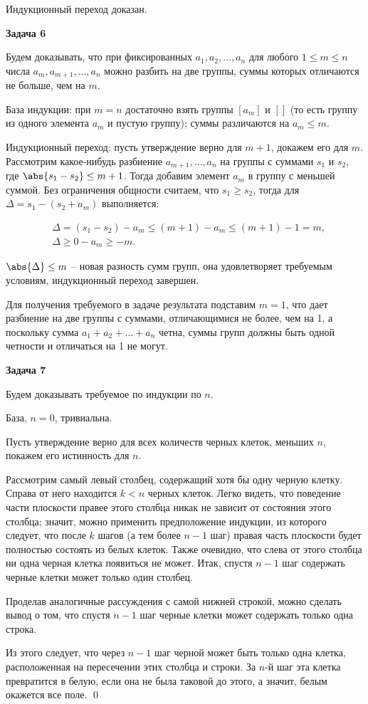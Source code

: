     Индукционный переход доказан.


\begin{center}
\textbf{Задача 6}
\end{center}    Будем доказывать, что при фиксированных $a_1, a_2, \dots, a_n$ для любого $1 \le m \le n$ числа $a_m, a_{m+1}, \dots, a_n$ можно разбить на две группы, суммы которых отличаются не больше, чем на $m$.

    База индукции: при $m = n$ достаточно взять группы $[a_m]$ и $[]$ (то есть группу из одного элемента $a_m$ и пустую группу); суммы различаются на $a_m \le m$.

    Индукционный переход: пусть утверждение верно для $m + 1$, докажем его для $m$. Рассмотрим какое-нибудь разбиение $a_{m+1}, \dots, a_n$ на группы с суммами $s_1$ и $s_2$, где $\abs{s_1 - s_2} \le m + 1$. Тогда добавим элемент $a_m$ в группу с меньшей суммой. Без ограничения общности считаем, что $s_1 \ge s_2$, тогда для $\Delta = s_1 - (s_2 + a_m)$ выполняется:

    \begin{align*}
        & \Delta = (s_1 - s_2) - a_m \le (m + 1) - a_m \le (m + 1) - 1 = m, \\
        & \Delta \ge 0 - a_m \ge -m.
    \end{align*}

    $\abs{\Delta} \le m$ -- новая разность сумм групп, она удовлетворяет требуемым условиям, индукционный переход завершен.

    Для получения требуемого в задаче результата подставим $m = 1$, что дает разбиение на две группы с суммами, отличающимися не более, чем на 1, а поскольку сумма $a_1 + a_2 + \dots + a_n$ четна, суммы групп должны быть одной четности и отличаться на 1 не могут.


\begin{center}
\textbf{Задача 7}
\end{center}    Будем доказывать требуемое по индукции по $n$.

    База, $n = 0$, тривиальна.

    Пусть утверждение верно для всех количеств черных клеток, меньших $n$, покажем его истинность для $n$.

    Рассмотрим самый левый столбец, содержащий хотя бы одну черную клетку. Справа от него находится $k < n$ черных клеток. Легко видеть, что поведение части плоскости правее этого столбца никак не зависит от состояния этого столбца; значит, можно применить предположение индукции, из которого следует, что после $k$ шагов (а тем более $n - 1$ шаг) правая часть плоскости будет полностью состоять из белых клеток. Также очевидно, что слева от этого столбца ни одна черная клетка появиться не может. Итак, спустя $n - 1$ шаг содержать черные клетки может только один столбец.

    Проделав аналогичные рассуждения с самой нижней строкой, можно сделать вывод о том, что спустя $n - 1$ шаг черные клетки может содержать только одна строка.

    Из этого следует, что через $n - 1$ шаг черной может быть только одна клетка, расположенная на пересечении этих столбца и строки. За $n$-й шаг эта клетка превратится в белую, если она не была таковой до этого, а значит, белым окажется все поле. \qed
